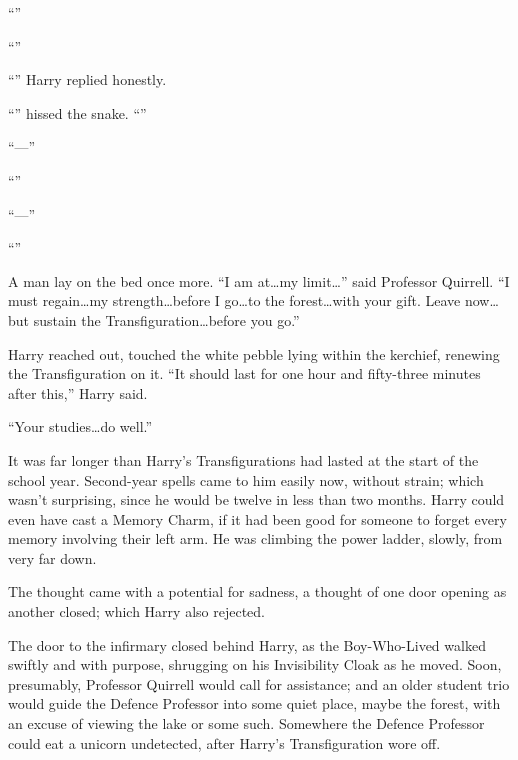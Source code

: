 “”

“”

“” Harry replied honestly.

“” hissed the snake. “”

“—”

“”

“—”

“”

A man lay on the bed once more. “I am at…my limit…” said Professor Quirrell. “I must regain…my strength…before I go…to the forest…with your gift. Leave now…but sustain the Transfiguration…before you go.”

Harry reached out, touched the white pebble lying within the kerchief, renewing the Transfiguration on it. “It should last for one hour and fifty-three minutes after this,” Harry said.

“Your studies…do well.”

It was far longer than Harry’s Transfigurations had lasted at the start of the school year. Second-year spells came to him easily now, without strain; which wasn’t surprising, since he would be twelve in less than two months. Harry could even have cast a Memory Charm, if it had been good for someone to forget every memory involving their left arm. He was climbing the power ladder, slowly, from very far down.

The thought came with a potential for sadness, a thought of one door opening as another closed; which Harry also rejected.

\later

The door to the infirmary closed behind Harry, as the Boy-Who-Lived walked swiftly and with purpose, shrugging on his Invisibility Cloak as he moved. Soon, presumably, Professor Quirrell would call for assistance; and an older student trio would guide the Defence Professor into some quiet place, maybe the forest, with an excuse of viewing the lake or some such. Somewhere the Defence Professor could eat a unicorn undetected, after Harry’s Transfiguration wore off.

